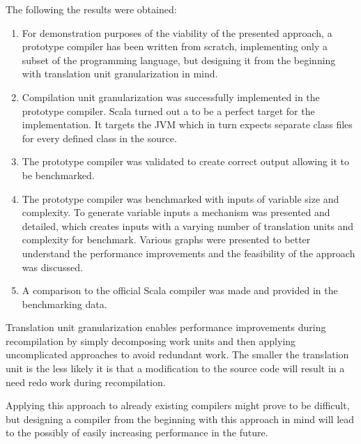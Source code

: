 \documentclass{VUMIFPSbakalaurinis}
\begin{document}
The following the results were obtained:

\begin{enumerate}
\item{
  For demonstration purposes of the viability of the presented approach, a prototype compiler has been written from scratch, implementing only a subset of the programming language, but designing it from the beginning with translation unit granularization in mind.
}
\item{
  Compilation unit granularization was successfully implemented in the prototype compiler.
	Scala turned out a to be a perfect target for the implementation.
	It targets the JVM which in turn expects separate class files for every defined class in the source.
}
\item{
  The prototype compiler was validated to create correct output allowing it to be benchmarked.
}
\item{
  The prototype compiler was benchmarked with inputs of variable size and complexity.
  To generate variable inputs a mechanism was presented and detailed, which creates inputs with a varying number of translation units and complexity for benchmark.
  Various graphs were presented to better understand the performance improvements and the feasibility of the approach was discussed.
}
\item{
  A comparison to the official Scala compiler was made and provided in the benchmarking data.
}


\end{enumerate}

\iffalse
{}

Translation unit granularization enables performance improvements during recompilation by simply decomposing work units and then applying uncomplicated approaches to avoid redundant work.
The smaller the translation unit is the less likely it is that a modification to the source code will result in a need redo work during recompilation.

Applying this approach to already existing compilers might prove to be difficult, but designing a compiler from the beginning with this approach in mind will lead to the possibly of easily increasing performance in the future.
\end{document}
